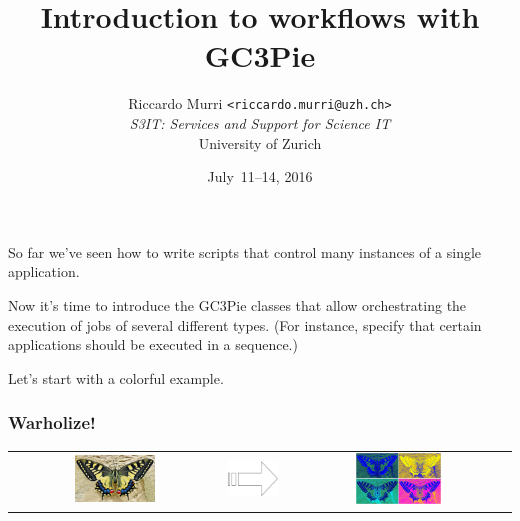 \documentclass[english,serif,mathserif,xcolor=pdftex,dvipsnames,table]{beamer}
\title[Workflows]{%
  Introduction to workflows with GC3Pie
}
\author[R. Murri, S3IT UZH]{%
  Riccardo Murri \texttt{<riccardo.murri@uzh.ch>}
  \\[1ex]
  \emph{S3IT: Services and Support for Science IT}
  \\[1ex]
  University of Zurich
}
\date{July~11--14, 2016}
\begin{document}
\maketitle









\begin{frame}

  So far we've seen how to write scripts that control many instances of
  a single application.

  \+
  Now it's time to introduce the GC3Pie classes that allow
  orchestrating the execution of jobs of several different types. (For
  instance, specify that certain applications should be executed in a
  sequence.)

  \+
  Let's start with a colorful example.
\end{frame}


\begin{frame}
  \frametitle{Warholize!}

  \begin{tabular}[c]{ccc}
    \includegraphics[width=0.4\textwidth]{fig/butterfly.jpg}
    &
    {\includegraphics[width=0.1\linewidth,totalheight=0.25\textheight]{fig/arrow.pdf}}
    &
    \includegraphics[width=0.4\textwidth]{fig/warholized-butterfly.jpg}
  \end{tabular}
\end{frame}
\end{document}

